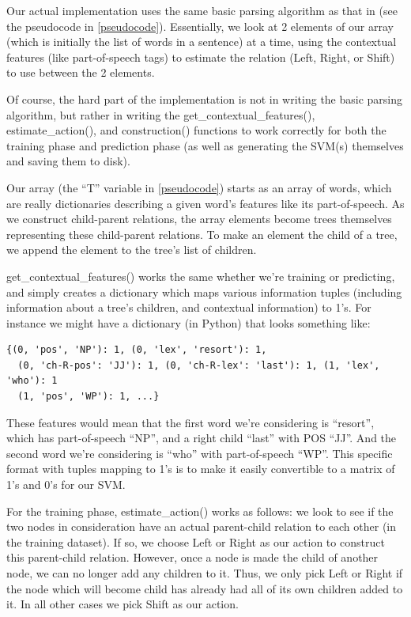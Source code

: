 \documentclass[12pt]{amsart}
\begin{document}
Our actual implementation uses the same basic parsing algorithm as that in 
\cite{yamada2003statistical} (see the pseudocode in \ref{pseudocode}). Essentially, we look at
2 elements of our array (which is initially the list of words in a sentence)
at a time, using the contextual features (like part-of-speech tags) to estimate
the relation (Left, Right, or Shift) to use between the 2 elements.

Of course, the hard part of the implementation is not in writing the basic 
parsing algorithm, but
rather in writing the get\_contextual\_features(), estimate\_action(),
and construction() functions
to work correctly for both the training phase and prediction phase (as well
as generating the SVM(s) themselves and saving them to disk).

Our array (the ``T'' variable in \ref{pseudocode}) 
starts as an array of words, which are really
dictionaries describing a given word's features like its part-of-speech. As we construct
child-parent relations, the array elements become trees themselves representing
these child-parent relations. To make an element the child of a tree, we append 
the element to the tree's list of children.

get\_contextual\_features() works the same whether we're training or predicting,
and simply creates a dictionary which maps various information tuples 
(including information about a tree's children, and contextual information) to
1's. For instance we might have a dictionary (in Python) that looks something 
like:
\begin{verbatim}
{(0, 'pos', 'NP'): 1, (0, 'lex', 'resort'): 1,
  (0, 'ch-R-pos': 'JJ'): 1, (0, 'ch-R-lex': 'last'): 1, (1, 'lex', 'who'): 1
  (1, 'pos', 'WP'): 1, ...}
\end{verbatim}
These features would mean that the first word we're considering is ``resort'',
which has part-of-speech ``NP'', and a right child ``last'' with POS ``JJ''. And the
second word we're considering is ``who'' with part-of-speech ``WP''. This specific format
with tuples mapping to 1's is to make it easily convertible to a matrix of 1's and 
0's for our SVM.

For the training phase, estimate\_action() works as follows: we look to see if
the two nodes in consideration have an actual parent-child relation to each 
other (in the training dataset). If so, we choose Left or Right as our action 
to construct this parent-child relation. However, once a node is made the 
child of another node, we can no longer add any children to it. Thus, we only
pick Left or Right if the node which will become child has already had all of
its own children added to it. In all other cases we pick Shift as our action.
\end{document}
